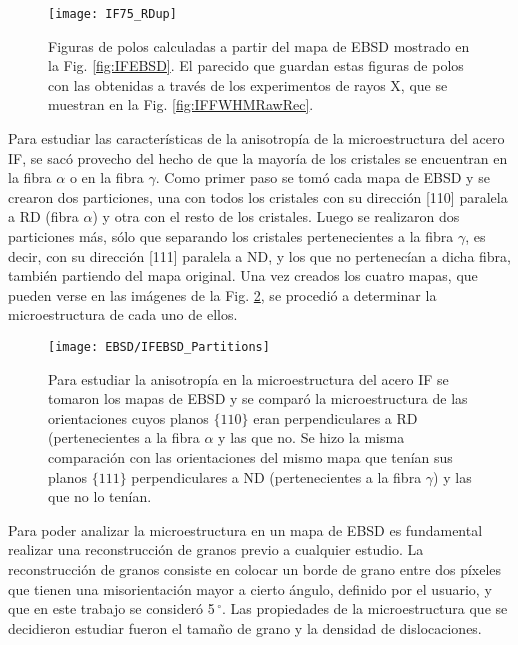 \begin{figure}[!htb]
  \centering
  \texttt{[image: IF75\_RDup]}
  \caption{Figuras de polos calculadas a partir del mapa de EBSD mostrado en la Fig. \ref{fig:IFEBSD}. El parecido que guardan estas figuras de polos con las obtenidas a través de los experimentos de rayos X, que se muestran en la Fig. \ref{fig:IFFWHMRawRec}.}
  \label{fig:IFEBSDText}
\end{figure}

Para estudiar las características de la anisotropía de la microestructura del acero IF, se sacó provecho del hecho de que la mayoría de los cristales se encuentran en la fibra $\alpha$ o en la fibra $\gamma$.
Como primer paso se tomó cada mapa de EBSD y se crearon dos particiones, una con todos los cristales con su dirección [110] paralela a RD (fibra $\alpha$) y otra con el resto de los cristales.
Luego se realizaron dos particiones más, sólo que separando los cristales pertenecientes a la fibra $\gamma$, es decir, con su dirección [111] paralela a ND, y los que no pertenecían a dicha fibra, también partiendo del mapa original.
Una vez creados los cuatro mapas, que pueden verse en las imágenes de la Fig. \ref{fig:IFEBSDPar}, se procedió a determinar la microestructura de cada uno de ellos.
\begin{figure}[!htb]
  \centering
  \texttt{[image: EBSD/IFEBSD\_Partitions]}
  \caption{Para estudiar la anisotropía en la microestructura del acero IF se tomaron los mapas de EBSD y se comparó la microestructura de las orientaciones cuyos planos $\{110\}$ eran perpendiculares a RD (pertenecientes a la fibra $\alpha$ y las que no. Se hizo la misma comparación con las orientaciones del mismo mapa que tenían sus planos $\{111\}$ perpendiculares a ND (pertenecientes a la fibra $\gamma$) y las que no lo tenían.}
  \label{fig:IFEBSDPar}
\end{figure}

Para poder analizar la microestructura en un mapa de EBSD es fundamental realizar una reconstrucción de granos previo a cualquier estudio.
La reconstrucción de granos consiste en colocar un borde de grano entre dos píxeles que tienen una misorientación mayor a cierto ángulo, definido por el usuario, y que en este trabajo se consideró 5\,$^{\circ}$. Las propiedades de la microestructura que se decidieron estudiar fueron el tamaño de grano y la densidad de dislocaciones.


